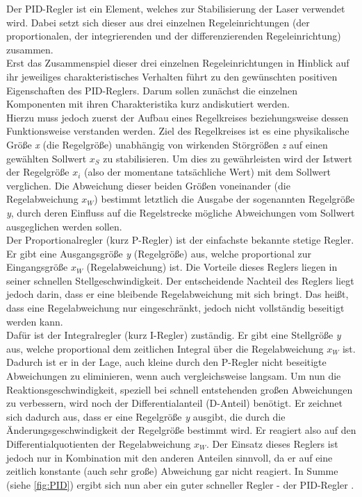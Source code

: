 \documentclass[
class=book,
accentcolor=1b,
custommargins=geometry,
fontsize=11pt,
thesis={type=Versuchsanleitung},
ruledheaders=all,
headline=false,
instbox=false,
marginpar=false,
title=small,
ignore-missing-data=true,
twoside=false,
logofile=apqdesign/tuda_logo.pdf,
pdfa=false %
]{apqpub}
\begin{document}
			Der PID-Regler ist ein Element, welches zur Stabilisierung der Laser verwendet wird. Dabei setzt sich dieser aus drei einzelnen Regeleinrichtungen (der proportionalen, der integrierenden und der differenzierenden Regeleinrichtung) zusammen.\\
			Erst das Zusammenspiel dieser drei einzelnen Regeleinrichtungen in Hinblick auf ihr jeweiliges charakteristisches Verhalten führt zu den gewünschten positiven Eigenschaften des PID-Reglers. Darum sollen zunächst die einzelnen Komponenten mit ihren Charakteristika kurz andiskutiert werden.\\
			Hierzu muss jedoch zuerst der Aufbau eines Regelkreises beziehungsweise dessen Funktionsweise verstanden werden. Ziel des Regelkreises ist es eine physikalische Größe \textit{x} (die Regelgröße) unabhängig von wirkenden Störgrößen \textit{z} auf einen gewählten Sollwert $x_S$ zu stabilisieren. Um dies zu gewährleisten wird der Istwert der Regelgröße $x_i$ (also der momentane tatsächliche Wert) mit dem Sollwert verglichen. Die Abweichung dieser beiden Größen voneinander (die Regelabweichung $x_W$) bestimmt letztlich die Ausgabe der sogenannten Regelgröße \textit{y}, durch deren Einfluss auf die Regelstrecke mögliche Abweichungen vom Sollwert ausgeglichen werden sollen.\\ 
			Der Proportionalregler (kurz P-Regler) ist der einfachste bekannte stetige Regler. Er gibt eine Ausgangsgröße \textit{y} (Regelgröße) aus, welche proportional zur Eingangsgröße $x_W$ (Regelabweichung) ist. Die Vorteile dieses Reglers liegen in seiner schnellen Stellgeschwindigkeit. Der entscheidende Nachteil des Reglers liegt jedoch darin, dass er eine bleibende Regelabweichung mit sich bringt. Das heißt, dass eine Regelabweichung nur eingeschränkt, jedoch nicht vollständig beseitigt werden kann.\\
			Dafür ist der Integralregler (kurz I-Regler) zuständig. Er gibt eine Stellgröße \textit{y} aus, welche proportional dem zeitlichen Integral über die Regelabweichung $x_W$ ist. Dadurch ist er in der Lage, auch kleine durch den P-Regler nicht beseitigte Abweichungen zu eliminieren, wenn auch vergleichsweise langsam.
			Um nun die Reaktionsgeschwindigkeit, speziell bei schnell entstehenden großen Abweichungen zu verbessern, wird noch der Differentialanteil (D-Anteil) benötigt. Er zeichnet sich dadurch aus, dass er eine Regelgröße \textit{y} ausgibt, die durch die Änderungsgeschwindigkeit der Regelgröße bestimmt wird. Er reagiert also auf den Differentialquotienten der Regelabweichung $x_W$. Der Einsatz dieses Reglers ist jedoch nur in Kombination mit den anderen Anteilen sinnvoll, da er auf eine zeitlich konstante (auch sehr große) Abweichung gar nicht reagiert. In Summe (siehe \autoref{fig:PID}) ergibt sich nun aber ein guter schneller Regler - der PID-Regler \cite{PID}.\\ 
			
\end{document}
